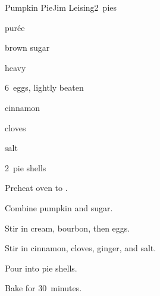 \begin{recipe}{Pumpkin Pie}{Jim Leising}{2~pies}

\begin{ingredients}
\item \C{1\threequarter}  pur\'ee
\item {} brown sugar
\item \C{1\half} heavy 
\item \C{\half} 
\item 6~eggs, lightly beaten
\item {} cinnamon
\item \tp{\half} cloves
\item \tp{1\half} 
\item \tp{\quarter} salt
\item 2~pie shells
\end{ingredients}

\begin{directions}
\item Preheat oven to .
\item Combine pumpkin and sugar.
\item Stir in cream, bourbon, then eggs.
\item Stir in cinnamon, cloves, ginger, and salt.
\item Pour into pie shells.
\item Bake for 30~minutes.
\end{directions}

\end{recipe}
